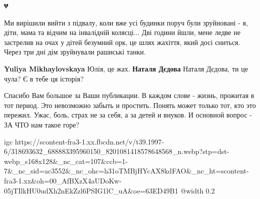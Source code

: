 💔


Ми вирішили вийти з підвалу, коли вже усі будинки поруч були зруйновані - я,
діти, мама та відчим на інвалідній колясці... Дві години йшли, мене ледве не
застрелив на очах у дітей безумний орк, це шлях жахіття, який досі сниться.
Через три дні дім зруйнували рашиські танки.

\begin{itemize} %
\textbf{Yuliya Mikhaylovskaya} Юлія, це жах. \textbf{Наталя Дєдова} Наталя Дєдова, ти це чула? Є в тебе ця історія?
\end{itemize} %


Спасибо Вам большое за Ваши публикации. В каждом слове - жизнь, прожитая в тот
период. Это невозможно забыть и простить. Понять может только тот, кто это
пережил. Ужас, боль, страх не за себя, а за детей и внуков. И основной вопрос -
ЗА ЧТО нам такое горе?


\ifcmt
  igc https://scontent-fra3-1.xx.fbcdn.net/v/t39.1997-6/318693632_688883395960150_8201081418578648568_n.webp?stp=dst-webp_s168x128&_nc_cat=107&ccb=1-7&_nc_sid=ac3552&_nc_ohc=h31oTMBjHYcAX8kdFAO&_nc_ht=scontent-fra3-1.xx&oh=00_AfBXzX4aUDoKw-05jTIlkHU0udXh2nEkZzl6PSIG1lC_uA&oe=63ED49B1
	@width 0.2
\fi
